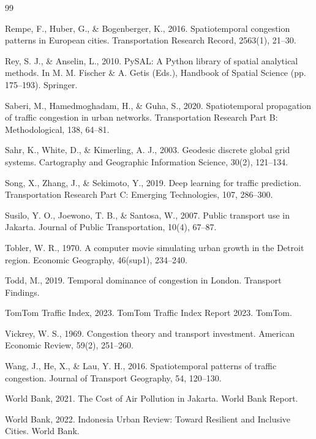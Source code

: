 \documentclass[12pt,a4paper]{article}
\begin{document}
\begin{thebibliography}{99}
\item Rempe, F., Huber, G., \& Bogenberger, K., 2016. Spatiotemporal congestion patterns in European cities. Transportation Research Record, 2563(1), 21--30.

\item Rey, S. J., \& Anselin, L., 2010. PySAL: A Python library of spatial analytical methods. In M. M. Fischer \& A. Getis (Eds.), Handbook of Spatial Science (pp. 175--193). Springer.

\item Saberi, M., Hamedmoghadam, H., \& Guha, S., 2020. Spatiotemporal propagation of traffic congestion in urban networks. Transportation Research Part B: Methodological, 138, 64--81.

\item Sahr, K., White, D., \& Kimerling, A. J., 2003. Geodesic discrete global grid systems. Cartography and Geographic Information Science, 30(2), 121--134.

\item Song, X., Zhang, J., \& Sekimoto, Y., 2019. Deep learning for traffic prediction. Transportation Research Part C: Emerging Technologies, 107, 286--300.

\item Susilo, Y. O., Joewono, T. B., \& Santosa, W., 2007. Public transport use in Jakarta. Journal of Public Transportation, 10(4), 67--87.

\item Tobler, W. R., 1970. A computer movie simulating urban growth in the Detroit region. Economic Geography, 46(sup1), 234--240.

\item Todd, M., 2019. Temporal dominance of congestion in London. Transport Findings.

\item TomTom Traffic Index, 2023. TomTom Traffic Index Report 2023. TomTom.

\item Vickrey, W. S., 1969. Congestion theory and transport investment. American Economic Review, 59(2), 251--260.

\item Wang, J., He, X., \& Lau, Y. H., 2016. Spatiotemporal patterns of traffic congestion. Journal of Transport Geography, 54, 120--130.

\item World Bank, 2021. The Cost of Air Pollution in Jakarta. World Bank Report.

\item World Bank, 2022. Indonesia Urban Review: Toward Resilient and Inclusive Cities. World Bank.


\end{thebibliography}
\end{document}
